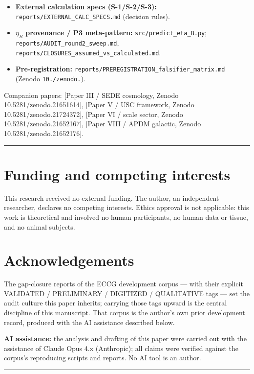 \documentclass[aps,prd,preprint,nofootinbib,superscriptaddress]{revtex4-2}
\begin{document}
\begin{itemize}
\item
  \textbf{External calculation specs (S-1/S-2/S-3):}
  \texttt{reports/\allowbreak EXTERNAL\_\allowbreak CALC\_\allowbreak SPECS.\allowbreak md} (decision rules).
\item
  \textbf{\(\eta_B\) provenance / P3 meta-pattern:}
  \texttt{src/\allowbreak predict\_\allowbreak eta\_\allowbreak B.\allowbreak py};
  \texttt{reports/\allowbreak AUDIT\_\allowbreak round2\_\allowbreak sweep.\allowbreak md},
  \texttt{reports/\allowbreak CLOSURES\_\allowbreak assumed\_\allowbreak vs\_\allowbreak calculated.\allowbreak md}.
\item
  \textbf{Pre-registration:}
  \texttt{reports/\allowbreak PREREGISTRATION\_\allowbreak falsifier\_\allowbreak matrix.\allowbreak md} (Zenodo
  \texttt{10./\allowbreak zenodo.}).
\end{itemize}

Companion papers: {[}Paper III / SEDE cosmology, Zenodo
10.5281/zenodo.21651614{]}, {[}Paper V / USC framework, Zenodo
10.5281/zenodo.21724372{]}, {[}Paper VI / scale sector, Zenodo
10.5281/zenodo.21652167{]}, {[}Paper VIII / APDM galactic, Zenodo
10.5281/zenodo.21652176{]}.

\begin{center}\rule{0.5\linewidth}{0.5pt}\end{center}

\section*{Funding and competing
interests}\label{funding-and-competing-interests}

This research received no external funding. The author, an independent
researcher, declares no competing interests. Ethics approval is not
applicable: this work is theoretical and involved no human participants,
no human data or tissue, and no animal subjects.

\section*{Acknowledgements}\label{acknowledgements}

The gap-closure reports of the ECCG development corpus --- with their
explicit VALIDATED / PRELIMINARY / DIGITIZED / QUALITATIVE tags --- set
the audit culture this paper inherits; carrying those tags upward is the
central discipline of this manuscript. That corpus is the author's own
prior development record, produced with the AI assistance described
below.

\textbf{AI assistance:} the analysis and drafting of this paper were
carried out with the assistance of Claude Opus 4.x (Anthropic); all
claims were verified against the corpus's reproducing scripts and
reports. No AI tool is an author.

\begin{center}\rule{0.5\linewidth}{0.5pt}\end{center}



\end{document}
